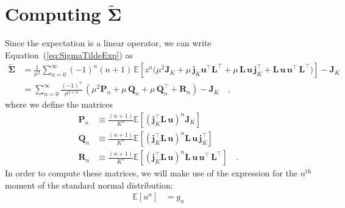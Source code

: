 \documentclass[modern]{aastex62}
\begin{document}
\clearpage

\appendix

\section{Computing $\tilde{\pmb{\Sigma}}$}
%
Since the expectation is a linear operator, we can write Equation~(\ref{eq:SigmaTildeExp})
as
%
\begin{align}
    \tilde{\pmb{\Sigma}}
     & =
    \frac{1}{\mu^2}
    \sum\limits_{n=0}^\infty
    (-1)^n (n + 1)
    \,
    \mathbb{E}\left[
        z^n
        \Bigg(
        \mu^2 \mathbf{J}_K
        +
        \mu \, \mathbf{j}_K\mathbf{u}^\top \mathbf{L}^\top
        +
        \mu \, \mathbf{L} \, \mathbf{u} \, \mathbf{j}_K^\top
        +
        \mathbf{L} \, \mathbf{u} \, \mathbf{u}^\top \, \mathbf{L}^\top
        \Bigg)
        \right]
    - \mathbf{J}_K
    \nonumber \\[0.5em]
     & =
    \sum\limits_{n=0}^\infty
    \frac{(-1)^n}{\mu^{2 + n}}
    \,
    \left(
    \mu^2 \mathbf{P}_n
    +
    \mu \, \mathbf{Q}_n
    +
    \mu \, \mathbf{Q}_n^\top
    +
    \mathbf{R}_n
    \right)
    - \mathbf{J}_K
    \quad,
\end{align}
%
where we define the matrices
%
\begin{align}
    \mathbf{P}_n & \equiv \frac{(n + 1)}{K^n}\mathbb{E}\left[ \left(\mathbf{j}_K^\top \mathbf{L} \, \mathbf{u}\right)^n \mathbf{J}_K \right]
    \nonumber                                                                                                                                                                                  \\[0.5em]
    \mathbf{Q}_n & \equiv \frac{(n + 1)}{K^n}\mathbb{E}\left[ \left(\mathbf{j}_K^\top \mathbf{L} \, \mathbf{u}\right)^n \mathbf{L} \, \mathbf{u} \, \mathbf{j}_K^\top \right]
    \nonumber                                                                                                                                                                                  \\[0.5em]
    \mathbf{R}_n & \equiv \frac{(n + 1)}{K^n}\mathbb{E}\left[ \left(\mathbf{j}_K^\top \mathbf{L} \, \mathbf{u}\right)^n \mathbf{L} \, \mathbf{u} \, \mathbf{u}^\top \, \mathbf{L}^\top \right]
    \quad.
\end{align}
%
In order to compute these matrices,
we will make use of the expression for the
$n^\mathrm{th}$ moment of the standard normal distribution:
%
\begin{align}
    \mathbb{E}\left[ u^n \right] & = g_n
\end{align}
\end{document}
